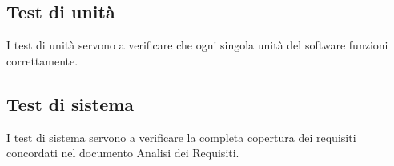 \documentclass[10pt]{article}
\begin{document}
\begin{justify}
\subsection{Test di unità}
I test di unità servono a verificare che ogni singola unità del software funzioni correttamente.\\


\subsection{Test di sistema} %
I test di sistema servono a verificare la completa copertura dei requisiti concordati nel documento Analisi dei Requisiti.\\


\end{justify}
\end{document}
